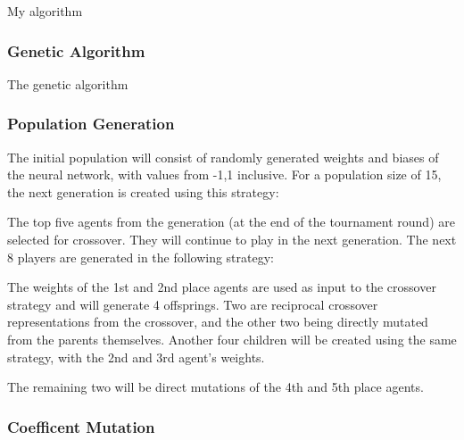 \documentclass[12pt,a4paper]{article}
\makeatletter
\def\BState{\State\hskip-\ALG@thistlm}
\makeatother
\begin{document}
\begin{algorithm}
    \caption{My algorithm}\label{euclid}
\end{algorithm}



\subsubsection{Genetic Algorithm}

The genetic algorithm 

\subsubsection{Population Generation}

The initial population will consist of randomly generated weights and biases of the neural network, with values from -1,1 inclusive. For a population size of 15, the next generation is created using this strategy:

The top five agents from the generation (at the end of the tournament round) are selected for crossover. They will continue to play in the next generation.
The next 8 players are generated in the following strategy:

The weights of the 1st and 2nd place agents are used as input to the crossover strategy and will generate 4 offsprings. Two are reciprocal crossover representations from the crossover, and the other two being directly mutated from the parents themselves. Another four children will be created using the same strategy, with the 2nd and 3rd agent's weights. 

The remaining two will be direct mutations of the 4th and 5th place agents.

\subsubsection{Coefficent Mutation}
\end{document}
